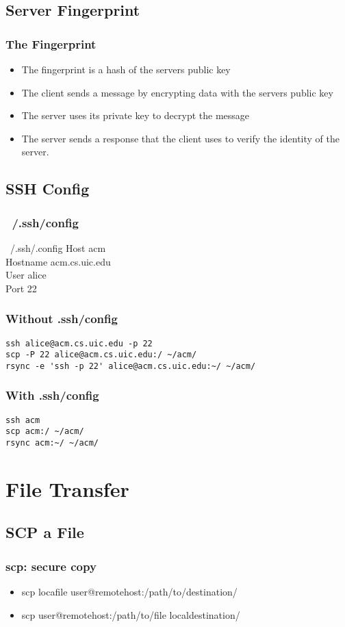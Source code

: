\documentclass[hyperref={pdfpagelabels=false}]{beamer}
\begin{document}
\subsection{Server Fingerprint}
\frame
{
    \frametitle{The Fingerprint}
    \begin{itemize}
    \item{The fingerprint is a hash of the servers public key}
    \item{The client sends a message by encrypting data with the servers public key}
    \item{The server uses its private key to decrypt the message}
    \item{The server sends a response that the client uses to verify the identity of the server.}
    \end{itemize}
}
\subsection{SSH Config}
\frame
{
	\frametitle{~/.ssh/config}
	\begin{block}{~/.ssh/.config}
	Host acm\\
	Hostname acm.cs.uic.edu\\
	User alice\\
	Port 22
	\end{block}
}
\begin{frame}[fragile]
\frametitle{Without .ssh/config}
\begin{verbatim}
ssh alice@acm.cs.uic.edu -p 22
scp -P 22 alice@acm.cs.uic.edu:/ ~/acm/
rsync -e 'ssh -p 22' alice@acm.cs.uic.edu:~/ ~/acm/
\end{verbatim}
\end{frame}
\begin{frame}[fragile]
\frametitle{With .ssh/config}
\begin{verbatim}
ssh acm
scp acm:/ ~/acm/
rsync acm:~/ ~/acm/
\end{verbatim}
\end{frame}
\section{File Transfer}
\subsection{SCP a File}
\frame
{
    \frametitle{scp: secure copy}
    \begin{itemize}
    \item{scp locafile user@remotehost:/path/to/destination/}
    \item{scp user@remotehost:/path/to/file localdestination/}
    \end{itemize}
}
\end{document}
